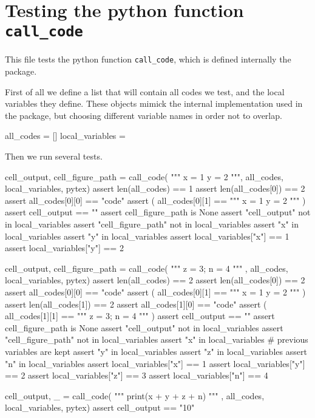 \documentclass[oneside]{book}
\begin{document}
\chapter{Testing the python function \texttt{call\_code}}

This file tests the python function \texttt{call\_code}, which is defined internally the package.

First of all we define a list that will contain all codes we test, and the local variables they define. These objects mimick the internal implementation used in the package, but choosing different variable names in order not to overlap.

\begin{pycell}
all_codes = []
local_variables = {}
\end{pycell}

Then we run several tests.

\begin{pycell}
cell_output, cell_figure_path = call_code(
"""
x = 1
y = 2
""",
all_codes, local_variables, pytex)
assert len(all_codes) == 1
assert len(all_codes[0]) == 2
assert all_codes[0][0] == "code"
assert (
    all_codes[0][1] == """
x = 1
y = 2
"""
)
assert cell_output == ""
assert cell_figure_path is None
assert "cell_output" not in local_variables
assert "cell_figure_path" not in local_variables
assert "x" in local_variables
assert "y" in local_variables
assert local_variables["x"] == 1
assert local_variables["y"] == 2
\end{pycell}

\begin{pycell}
cell_output, cell_figure_path = call_code(
"""
z = 3; n = 4
"""
,
all_codes, local_variables, pytex)
assert len(all_codes) == 2
assert len(all_codes[0]) == 2
assert all_codes[0][0] == "code"
assert (
    all_codes[0][1] == """
x = 1
y = 2
"""
)
assert len(all_codes[1]) == 2
assert all_codes[1][0] == "code"
assert (
    all_codes[1][1] == """
z = 3; n = 4
"""
)
assert cell_output == ""
assert cell_figure_path is None
assert "cell_output" not in local_variables
assert "cell_figure_path" not in local_variables
assert "x" in local_variables  # previous variables are kept
assert "y" in local_variables
assert "z" in local_variables
assert "n" in local_variables
assert local_variables["x"] == 1
assert local_variables["y"] == 2
assert local_variables["z"] == 3
assert local_variables["n"] == 4
\end{pycell}

\begin{pycell}
cell_output, _ = call_code(
"""
print(x + y + z + n)
"""
,
all_codes, local_variables, pytex)
assert cell_output == "10"
\end{pycell}
\end{document}
